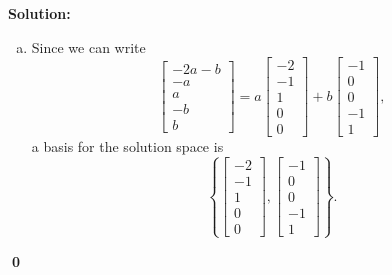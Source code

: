\documentclass{article}
\newenvironment{solution}
{
  \ignorespaces
  \textbf{Solution:}
}
{
  \ignorespacesafterend
  \begin{flushright}
  {\bfseries \qed}
  \end{flushright}
}
\begin{document}
\begin{solution}
\begin{enumerate}[(a)]
\item Since we can write \[\begin{bmatrix} -2a-b \\ -a \\ a \\ -b \\ b \end{bmatrix} = a \begin{bmatrix} -2 \\ -1 \\ 1 \\ 0 \\ 0 \end{bmatrix} + b \begin{bmatrix} -1 \\ 0 \\ 0 \\ -1 \\ 1 \end{bmatrix}, \]
a basis for the solution space is
\[ \left \{ \begin{bmatrix} -2 \\ -1 \\ 1 \\ 0 \\ 0 \end{bmatrix} , \begin{bmatrix} -1 \\ 0 \\ 0 \\ -1 \\ 1 \end{bmatrix} \right\}.\]
\end{enumerate}
\end{solution}
\end{document}
